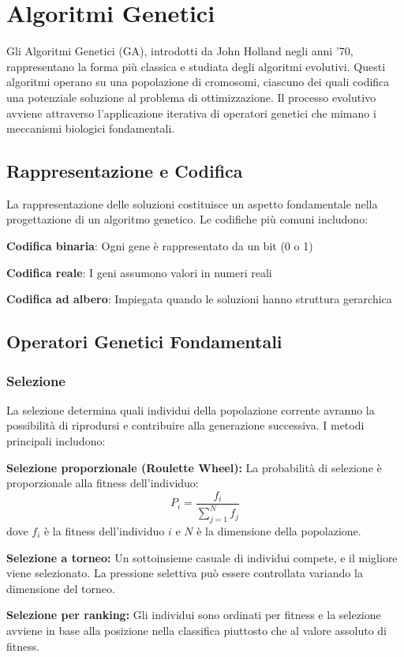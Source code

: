 \section{Algoritmi Genetici}
Gli Algoritmi Genetici (GA), introdotti da John Holland negli anni '70, rappresentano la forma più classica e studiata degli algoritmi evolutivi. Questi algoritmi operano su una popolazione di cromosomi, ciascuno dei quali codifica una potenziale soluzione al problema di ottimizzazione. Il processo evolutivo avviene attraverso l'applicazione iterativa di operatori genetici che mimano i meccanismi biologici fondamentali.

\subsection{Rappresentazione e Codifica}
La rappresentazione delle soluzioni costituisce un aspetto fondamentale nella progettazione di un algoritmo genetico. Le codifiche più comuni includono:
\begin{compactitemize}
\item \textbf{Codifica binaria}: Ogni gene è rappresentato da un bit (0 o 1)
\item \textbf{Codifica reale}: I geni assumono valori in numeri reali
\item \textbf{Codifica ad albero}: Impiegata quando le soluzioni hanno struttura gerarchica
\end{compactitemize}

\subsection{Operatori Genetici Fondamentali}

\subsubsection{Selezione}
La selezione determina quali individui della popolazione corrente avranno la possibilità di riprodursi e contribuire alla generazione successiva. I metodi principali includono:

\begin{compactitemize}
    \item \textbf{Selezione proporzionale (Roulette Wheel):} La probabilità di selezione è proporzionale alla fitness dell'individuo:
    \[
    P_i = \frac{f_i}{\sum_{j=1}^{N} f_j}
    \]
    dove $f_i$ è la fitness dell'individuo $i$ e $N$ è la dimensione della popolazione.
    
    \item \textbf{Selezione a torneo:} Un sottoinsieme casuale di individui compete, e il migliore viene selezionato. La pressione selettiva può essere controllata variando la dimensione del torneo.
    
    \item \textbf{Selezione per ranking:} Gli individui sono ordinati per fitness e la selezione avviene in base alla posizione nella classifica piuttosto che al valore assoluto di fitness.
\end{compactitemize}

